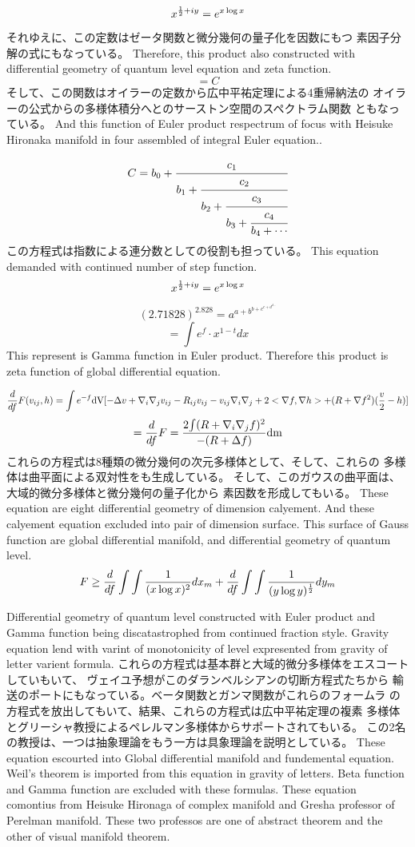 \documentclass{jsarticle}
\begin{document}
  $$ x^{{1 \over 2} + iy} = e^{x \log x} $$
  それゆえに、この定数はゼータ関数と微分幾何の量子化を因数にもつ
  素因子分解の式にもなっている。
  Therefore, this product also constructed with differential geometry
  of quantum level equation and zeta function.
  $$ = C $$ 
  そして、この関数はオイラーの定数から広中平祐定理による4重帰納法の
  オイラーの公式からの多様体積分へとのサーストン空間のスペクトラム関数
  ともなっている。
  And this function of Euler product respectrum of focus with
  Heisuke Hironaka manifold in four assembled of integral Euler equation.. 

  $$ C =  b_0 + \cfrac{c_1}{b_1 +
	  \cfrac{c_2}{b_2 +
	  \cfrac{c_3}{b_3 +
	  \cfrac{c_4}{b_4 + \cdots}}}} $$
  この方程式は指数による連分数としての役割も担っている。  
  This equation demanded with continued number of step function.
  $$ x^{{1 \over 2} + iy} = e^{x \log x} $$
  $$ (2.71828)^{2.828} = a^{a + b^{b + c^{c + d^{d \cdots }}}} $$
  $$ = \int e^f \cdot x^{1 - t}dx $$
  This represent is Gamma function in Euler product.
  Therefore this product is zeta function of global differential equation.

  $$ {d \over d f}F(v_{ij},h) = \int {e^{-f}\mathrm{dV}}
  [- \Delta v + \nabla_{i}\nabla_{j}
  v_{ij} - R_{ij}v_{ij} - v_{ij}\nabla_{i}\nabla_{j} + 2 <\nabla f,\nabla h>
  + (R + \nabla f^2)({v \over 2} - h)]$$
  $$ = {d \over d f}F = {2 {\int (R + \nabla_{i}\nabla_{j} f)^2} \over 
  { - (R + \Delta f)}}\mathrm{dm} $$
  これらの方程式は8種類の微分幾何の次元多様体として、そして、これらの
  多様体は曲平面による双対性をも生成している。 
  そして、このガウスの曲平面は、大域的微分多様体と微分幾何の量子化から
  素因数を形成してもいる。
  These equation are eight differential geometry of dimension calyement.
  And these calyement equation excluded into pair of dimension surface.
  This surface of Gauss function are global differential manifold,
  and differential geometry of quantum level.
  $$ F \ge {d \over d f}\int \int{1 \over (x \log x)^2}dx_m 
  + {d \over d f}\int \int{1 \over (y \log y)^{1 \over 2}}dy_m $$

 
  Differential geometry of quantum level constructed with Euler product
  and Gamma function being discatastrophed from continued fraction style.
  Gravity equation lend with varint of monotonicity of level expresented
  from gravity of letter varient formula.
  これらの方程式は基本群と大域的微分多様体をエスコートしていもいて、
  ヴェイユ予想がこのダランベルシアンの切断方程式たちから
  輸送のポートにもなっている。ベータ関数とガンマ関数がこれらのフォームラ
  の方程式を放出してもいて、結果、これらの方程式は広中平祐定理の複素
  多様体とグリーシャ教授によるペレルマン多様体からサポートされてもいる。
  この2名の教授は、一つは抽象理論をもう一方は具象理論を説明としている。
  These equation escourted into Global differential manifold and
  fundemental equation.
  Weil's theorem is imported from this equation in gravity of letters.
  Beta function and Gamma function are excluded with these formulas.
  These equation comontius from Heisuke Hironaga of complex manifold
  and Gresha professor of Perelman manifold.
  These two professos are one of abstract theorem and the other of
  visual manifold theorem.
\end{document}

